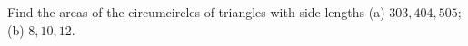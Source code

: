Find the areas of the circumcircles of triangles with side lengths (a) $303,404,505$; (b) $8,10,12$.

